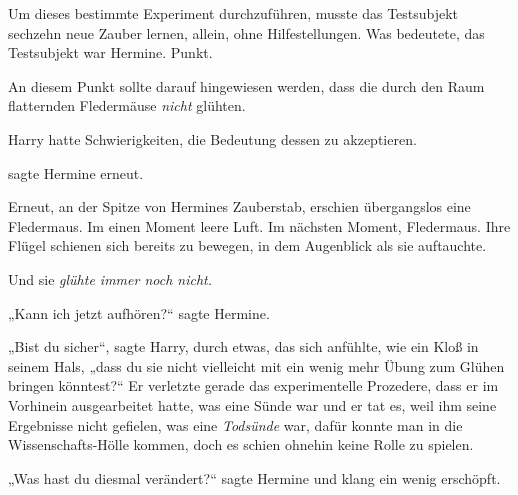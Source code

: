 Um dieses bestimmte Experiment durchzuführen, musste das Testsubjekt sechzehn neue Zauber lernen, allein, ohne Hilfestellungen. Was bedeutete, das Testsubjekt war Hermine. Punkt.

An diesem Punkt sollte darauf hingewiesen werden, dass die durch den Raum flatternden Fledermäuse \emph{nicht} glühten.

Harry hatte Schwierigkeiten, die Bedeutung dessen zu akzeptieren.

 sagte Hermine erneut.

Erneut, an der Spitze von Hermines Zauberstab, erschien übergangslos eine Fledermaus. Im einen Moment leere Luft. Im nächsten Moment, Fledermaus. Ihre Flügel schienen sich bereits zu bewegen, in dem Augenblick als sie auftauchte.

Und sie \emph{glühte immer noch nicht.}

„Kann ich jetzt aufhören?“ sagte Hermine.

„Bist du sicher“, sagte Harry, durch etwas, das sich anfühlte, wie ein Kloß in seinem Hals, „dass du sie nicht vielleicht mit ein wenig mehr Übung zum Glühen bringen könntest?“ Er verletzte gerade das experimentelle Prozedere, dass er im Vorhinein ausgearbeitet hatte, was eine Sünde war und er tat es, weil ihm seine Ergebnisse nicht gefielen, was eine \emph{Todsünde} war, dafür konnte man in die Wissenschafts-Hölle kommen, doch es schien ohnehin keine Rolle zu spielen.

„Was hast du diesmal verändert?“ sagte Hermine und klang ein wenig erschöpft.

